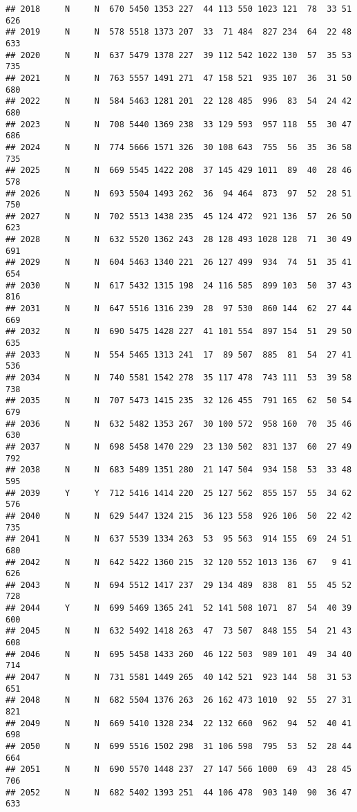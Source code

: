 \documentclass[]{article}
\begin{document}
\begin{verbatim}
## 2018     N     N  670 5450 1353 227  44 113 550 1023 121  78  33 51  626
## 2019     N     N  578 5518 1373 207  33  71 484  827 234  64  22 48  633
## 2020     N     N  637 5479 1378 227  39 112 542 1022 130  57  35 53  735
## 2021     N     N  763 5557 1491 271  47 158 521  935 107  36  31 50  680
## 2022     N     N  584 5463 1281 201  22 128 485  996  83  54  24 42  680
## 2023     N     N  708 5440 1369 238  33 129 593  957 118  55  30 47  686
## 2024     N     N  774 5666 1571 326  30 108 643  755  56  35  36 58  735
## 2025     N     N  669 5545 1422 208  37 145 429 1011  89  40  28 46  578
## 2026     N     N  693 5504 1493 262  36  94 464  873  97  52  28 51  750
## 2027     N     N  702 5513 1438 235  45 124 472  921 136  57  26 50  623
## 2028     N     N  632 5520 1362 243  28 128 493 1028 128  71  30 49  691
## 2029     N     N  604 5463 1340 221  26 127 499  934  74  51  35 41  654
## 2030     N     N  617 5432 1315 198  24 116 585  899 103  50  37 43  816
## 2031     N     N  647 5516 1316 239  28  97 530  860 144  62  27 44  669
## 2032     N     N  690 5475 1428 227  41 101 554  897 154  51  29 50  635
## 2033     N     N  554 5465 1313 241  17  89 507  885  81  54  27 41  536
## 2034     N     N  740 5581 1542 278  35 117 478  743 111  53  39 58  738
## 2035     N     N  707 5473 1415 235  32 126 455  791 165  62  50 54  679
## 2036     N     N  632 5482 1353 267  30 100 572  958 160  70  35 46  630
## 2037     N     N  698 5458 1470 229  23 130 502  831 137  60  27 49  792
## 2038     N     N  683 5489 1351 280  21 147 504  934 158  53  33 48  595
## 2039     Y     Y  712 5416 1414 220  25 127 562  855 157  55  34 62  576
## 2040     N     N  629 5447 1324 215  36 123 558  926 106  50  22 42  735
## 2041     N     N  637 5539 1334 263  53  95 563  914 155  69  24 51  680
## 2042     N     N  642 5422 1360 215  32 120 552 1013 136  67   9 41  626
## 2043     N     N  694 5512 1417 237  29 134 489  838  81  55  45 52  728
## 2044     Y     N  699 5469 1365 241  52 141 508 1071  87  54  40 39  600
## 2045     N     N  632 5492 1418 263  47  73 507  848 155  54  21 43  608
## 2046     N     N  695 5458 1433 260  46 122 503  989 101  49  34 40  714
## 2047     N     N  731 5581 1449 265  40 142 521  923 144  58  31 53  651
## 2048     N     N  682 5504 1376 263  26 162 473 1010  92  55  27 31  821
## 2049     N     N  669 5410 1328 234  22 132 660  962  94  52  40 41  698
## 2050     N     N  699 5516 1502 298  31 106 598  795  53  52  28 44  664
## 2051     N     N  690 5570 1448 237  27 147 566 1000  69  43  28 45  706
## 2052     N     N  682 5402 1393 251  44 106 478  903 140  90  36 47  633

\end{verbatim}
\end{document}
